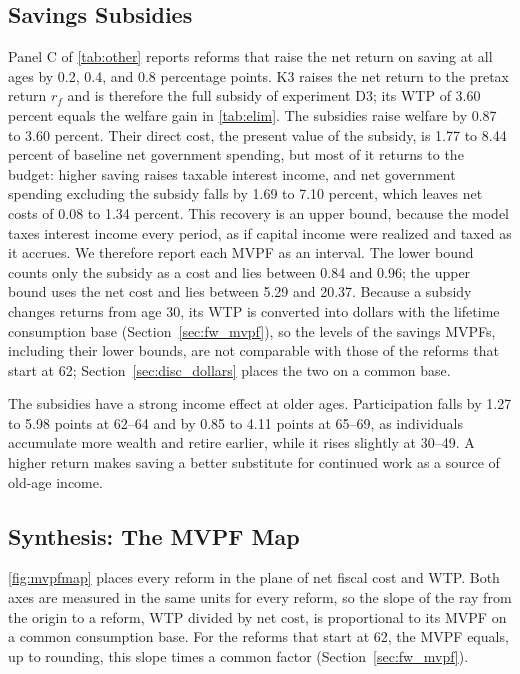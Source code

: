 \subsection{Savings Subsidies}\label{sec:results_savings}

Panel C of \autoref{tab:other} reports reforms that raise the net return on saving at all ages by 0.2, 0.4, and 0.8 percentage points. K3 raises the net return to the pretax return $r_f$ and is therefore the full subsidy of experiment D3; its WTP of 3.60 percent equals the welfare gain in \autoref{tab:elim}. The subsidies raise welfare by 0.87 to 3.60 percent. Their direct cost, the present value of the subsidy, is 1.77 to 8.44 percent of baseline net government spending, but most of it returns to the budget: higher saving raises taxable interest income, and net government spending excluding the subsidy falls by 1.69 to 7.10 percent, which leaves net costs of 0.08 to 1.34 percent. This recovery is an upper bound, because the model taxes interest income every period, as if capital income were realized and taxed as it accrues. We therefore report each MVPF as an interval. The lower bound counts only the subsidy as a cost and lies between 0.84 and 0.96; the upper bound uses the net cost and lies between 5.29 and 20.37. Because a subsidy changes returns from age 30, its WTP is converted into dollars with the lifetime consumption base (Section~\ref{sec:fw_mvpf}), so the levels of the savings MVPFs, including their lower bounds, are not comparable with those of the reforms that start at 62; Section~\ref{sec:disc_dollars} places the two on a common base.

The subsidies have a strong income effect at older ages. Participation falls by 1.27 to 5.98 points at 62--64 and by 0.85 to 4.11 points at 65--69, as individuals accumulate more wealth and retire earlier, while it rises slightly at 30--49. A higher return makes saving a better substitute for continued work as a source of old-age income.

\subsection{Synthesis: The MVPF Map}\label{sec:results_map}

\autoref{fig:mvpfmap} places every reform in the plane of net fiscal cost and WTP. Both axes are measured in the same units for every reform, so the slope of the ray from the origin to a reform, WTP divided by net cost, is proportional to its MVPF on a common consumption base. For the reforms that start at 62, the MVPF equals, up to rounding, this slope times a common factor (Section~\ref{sec:fw_mvpf}).

